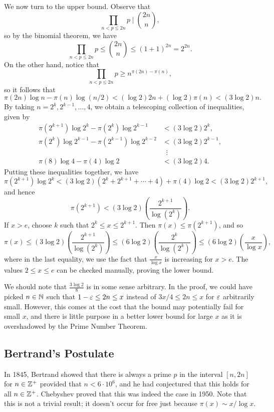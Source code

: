 \begin{pf}
We now turn to the upper bound. Observe that 
\[ \prod_{n < p \leq 2n} p \; \bigg\rvert \; \binom{2n}n, \]
so by the binomial theorem, we have 
\[ \prod_{n < p \leq 2n} p \leq \binom{2n}n \leq (1+1)^{2n} = 2^{2n}. \]
On the other hand, notice that 
\[ \prod_{n < p \leq 2n} p \geq n^{\pi(2n) - \pi(n)}, \]
so it follows that 
\[ \pi(2n) \log n - \pi(n) \log(n/2) < (\log 2) 2n + (\log 2)\pi(n) < (3\log 2)n. \]
By taking $n = 2^k, 2^{k-1}, \dots, 4$, we obtain a telescoping collection of inequalities, given by 
\begin{align*}
    \pi(2^{k+1})\log2^k - \pi(2^k)\log2^{k-1} &< (3\log2)2^k, \\
    \pi(2^k)\log2^{k-1} - \pi(2^{k-1})\log2^{k-2} &< (3\log2)2^{k-1}, \\[-0.5em]
    &\;\;\vdots \\
    \pi(8)\log4-\pi(4)\log2 &< (3\log2)4.
\end{align*}
Putting these inequalities together, we have 
\[ \pi(2^{k+1})\log 2^k < (3\log 2)(2^k + 2^{k+1} + \cdots + 4) + \pi(4)\log2 < (3\log2)2^{k+1}, \]
and hence 
\[ \pi(2^{k+1}) < (3\log2) \left( \frac{2^{k+1}}{\log(2^k)} \right). \]
If $x > e$, choose $k$ such that $2^k \leq x \leq 2^{k+1}$. Then $\pi(x) \leq \pi(2^{k+1})$, and so 
\[ \pi(x) \leq (3\log2) \left( \frac{2^{k+1}}{\log(2^k)} \right) \leq (6\log2) \left( \frac{2^k}{\log(2^k)} \right) \leq (6\log 2) \left( \frac{x}{\log x} \right), \] 
where in the last equality, we use the fact that $\frac{x}{\log x}$ is increasing for $x > e$. 
The values $2 \leq x \leq e$ can be checked manually, proving the lower bound. 
\end{pf}

We should note that $\frac{3\log 2}8$ is in some sense arbitrary. In the proof, we could have picked
$n \in \mathbb{N}$ such that $1 - \varepsilon \leq 2n \leq x$ instead of $3x/4 \leq 2n \leq x$ for $\varepsilon$ 
arbitrarily small. However, this comes at the cost that the bound may potentially fail for small $x$,
and there is little purpose in a better lower bound for large $x$ as it is overshadowed by the 
Prime Number Theorem.

\subsection{Bertrand's Postulate}
In 1845, Bertrand showed that there is always a prime $p$ in the interval $[n, 2n]$ for $n \in \mathbb{Z}^+$
provided that $n < 6 \cdot 10^6$, and he had conjectured that this holds for all $n \in \mathbb{Z}^+$. Chebyshev 
proved that this was indeed the case in 1950. 
Note that this is not a trivial result; it doesn't occur for free just because $\pi(x) \sim x/\log x$. 

